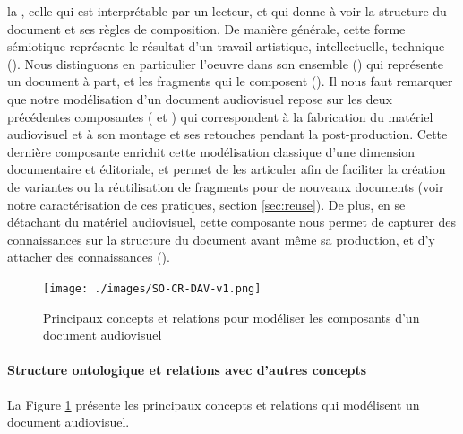 \begin{liste}
	\item la , celle qui est interprétable par un lecteur, et qui donne à voir la structure du document et ses règles de composition.
	De manière générale, cette forme sémiotique représente le résultat d'un travail artistique, intellectuelle, technique ().
	Nous distinguons en particulier l'oeuvre dans son ensemble () qui représente un document à part, et les fragments qui le composent ().
	Il nous faut remarquer que notre modélisation d'un document audiovisuel repose sur les deux précédentes composantes ( et ) qui correspondent à la fabrication du matériel audiovisuel et à son montage et ses retouches pendant la post-production.
	Cette dernière composante enrichit cette modélisation classique d'une dimension documentaire et éditoriale, et permet de les articuler afin de faciliter la création de variantes ou la réutilisation de fragments pour de nouveaux documents (voir notre caractérisation de ces pratiques, section \ref{sec:reuse}).
	De plus, en se détachant du matériel audiovisuel, cette composante nous permet de capturer des connaissances sur la structure du document avant même sa production, et d'y attacher des connaissances ().
\end{liste}

\begin{figure}[ht!]
\centering
\texttt{[image: ./images/SO-CR-DAV-v1.png]}
\caption{Principaux concepts et relations pour modéliser les composants d'un document audiovisuel}
\label{img:so-cr-dav}
\end{figure}

\paragraph{Structure ontologique et relations avec d'autres concepts}
La Figure \ref{img:so-cr-dav} présente les principaux concepts et relations qui modélisent un document audiovisuel. 

